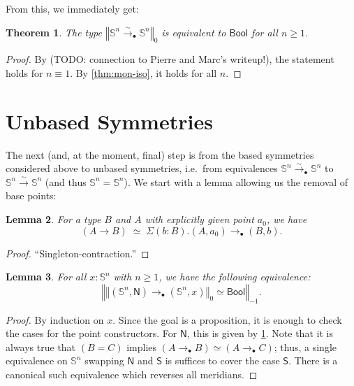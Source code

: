 \documentclass[11pt,a4paper,oneside,reqno]{amsart}
\newtheorem{theorem}{Theorem}
\newtheorem{lemma}[theorem]{Lemma}
\theoremstyle{definition}
\theoremstyle{remark}
\newcommand{\sph}[1]{{\mathbb S}^{#1}}
\newcommand{\trunc}[2]{\mathopen{}\left\Vert #2\right\Vert_{#1}\mathclose{}}
\newcommand{\North}{\mathsf N}
\newcommand{\South}{\mathsf S}
\begin{document}
From this, we immediately get:

\begin{theorem} \label{thm:Sn-bool}
 The type
 $\trunc 0 {\sph n \xrightarrow{\sim}_\bullet \sph n}$
is equivalent to $\mathsf{Bool}$ for all $n \geq 1$.
\end{theorem}
\begin{proof}
 By (TODO: connection to Pierre and Marc's writeup!), the statement holds for $n \equiv 1$.
 By \cref{thm:mon-iso}, it holds for all $n$.
\end{proof}



\section{Unbased Symmetries}

The next (and, at the moment, final) step is from the based symmetries considered above to unbased symmetries, i.e.\ from equivalences $\sph n \xrightarrow{\sim}_\bullet \sph n$ to $\sph n \xrightarrow{\sim} \sph n$ (and thus $\sph n = \sph n$).
We start with a lemma allowing us the removal of base points:
\begin{lemma} \label{lem:rm-base-points}
 For a type $B$ and $A$ with explicitly given point $a_0$, we have
 \begin{equation}
  (A \to B) \; \simeq  \; \Sigma (b : B). (A,a_0) \to_\bullet (B,b).
 \end{equation}
\end{lemma}
\begin{proof}
 ``Singleton-contraction.''
\end{proof}


\begin{lemma} \label{lem:eqv-to-bool}
 For all $x : \sph n$ with $n \geq 1$, we have the following equivalence:
 \begin{equation}
  \trunc {-1} {\trunc 0 {(\sph n, \North) \to_\bullet (\sph n, x)} \simeq \mathsf{Bool}}.
 \end{equation}
\end{lemma}
\begin{proof}
 By induction on $x$.
 Since the goal is a proposition, it is enough to check the cases for the point constructors. For $\North$, this is given by 
 \cref{thm:Sn-bool}. Note that it is always true that $(B = C)$ implies $(A \to_\bullet B) \simeq (A \to_\bullet C)$;
 thus, a single equivalence on $\sph n$ swapping $\North$ and $\South$ is suffices to cover the case $\South$.
 There is a canonical such equivalence which reverses all meridians.
\end{proof}
\end{document}
